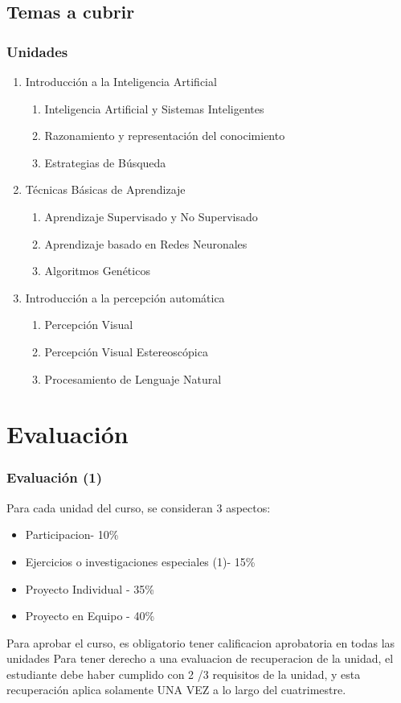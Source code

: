 \documentclass[aspectratio=169]{beamer}
\begin{document}
\begin{frame}
\section{Temas a cubrir}
\frametitle{Unidades }
\begin{enumerate}

\item Introducción a la Inteligencia Artificial
\begin{enumerate}
\item Inteligencia Artificial y Sistemas Inteligentes
\item Razonamiento y representación del conocimiento
\item Estrategias de Búsqueda
\end{enumerate}

\item Técnicas Básicas de Aprendizaje
\begin{enumerate}
\item Aprendizaje Supervisado y No Supervisado
\item Aprendizaje basado en Redes Neuronales
\item Algoritmos Genéticos
\end{enumerate}

\item Introducción a la percepción automática
\begin{enumerate}
\item Percepción Visual
\item Percepción Visual Estereoscópica
\item Procesamiento de Lenguaje Natural
\end{enumerate}

\end{enumerate}

\end{frame}

\section{Evaluación}

\begin{frame}
\frametitle{Evaluación (1)}
Para cada unidad del curso, se consideran 3 aspectos:
\begin{itemize}
\item Participacion- 10\%
\item Ejercicios o investigaciones especiales (1)- 15\%
\item Proyecto Individual  - 35\%
\item Proyecto en Equipo - 40\%
\end{itemize}
Para aprobar el curso, es obligatorio tener calificacion aprobatoria en todas las unidades
Para tener derecho a una evaluacion de recuperacion de la unidad, el estudiante debe haber cumplido con 2 /3 requisitos de la unidad, y esta recuperación aplica solamente UNA VEZ a lo largo del cuatrimestre.
\end{frame}
\end{document}
